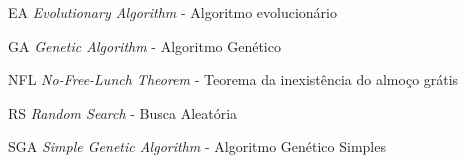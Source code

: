 \documentclass[
	12pt,				%
	openright,			%
	twoside,			%
	a4paper,			%
	english,			%
	brazil				%
	]{abntex2}
\begin{document}
\listoftables*
\cleardoublepage

\begin{siglas}
	\item[EA] \textit{Evolutionary Algorithm} - Algoritmo evolucionário
	\item[GA] \textit{Genetic Algorithm}	- Algoritmo Genético
	\item[NFL] \textit{No-Free-Lunch Theorem} - Teorema da inexistência do almoço grátis
	\item[RS] \textit{Random Search} - Busca Aleatória
	\item[SGA] \textit{Simple Genetic Algorithm} - Algoritmo Genético Simples
\end{siglas}


\tableofcontents*
\cleardoublepage



\textual




%
\end{document}
